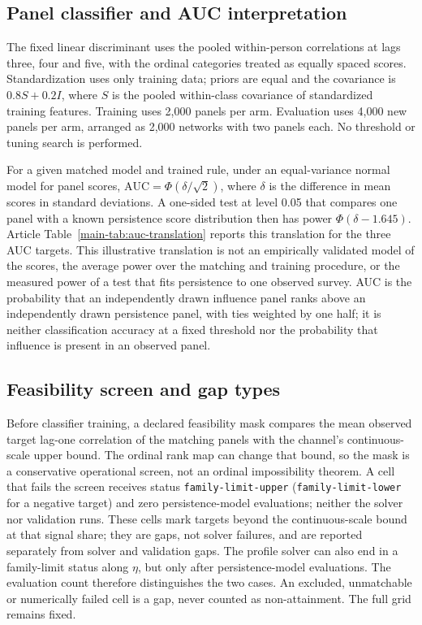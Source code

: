 \subsection{Panel classifier and AUC interpretation}\label{sec:dd-classifier}

The fixed linear discriminant uses the pooled within-person correlations at lags three, four and five, with the ordinal categories treated as equally spaced scores. Standardization uses only training data; priors are equal and the covariance is $0.8S+0.2I$, where $S$ is the pooled within-class covariance of standardized training features. Training uses 2,000 panels per arm. Evaluation uses 4,000 new panels per arm, arranged as 2,000 networks with two panels each. No threshold or tuning search is performed.

For a given matched model and trained rule, under an equal-variance normal model for panel scores, $\mathrm{AUC}=\Phi(\delta/\sqrt2)$, where $\delta$ is the difference in mean scores in standard deviations. A one-sided test at level 0.05 that compares one panel with a known persistence score distribution then has power $\Phi(\delta-1.645)$. Article Table~\ref{main-tab:auc-translation} reports this translation for the three AUC targets. This illustrative translation is not an empirically validated model of the scores, the average power over the matching and training procedure, or the measured power of a test that fits persistence to one observed survey. AUC is the probability that an independently drawn influence panel ranks above an independently drawn persistence panel, with ties weighted by one half; it is neither classification accuracy at a fixed threshold nor the probability that influence is present in an observed panel.

\subsection{Feasibility screen and gap types}\label{sec:dd-feasibility}

Before classifier training, a declared feasibility mask compares the mean observed target lag-one correlation of the matching panels with the channel's continuous-scale upper bound. The ordinal rank map can change that bound, so the mask is a conservative operational screen, not an ordinal impossibility theorem. A cell that fails the screen receives status \texttt{family-limit-upper} (\texttt{family-limit-lower} for a negative target) and zero persistence-model evaluations; neither the solver nor validation runs. These cells mark targets beyond the continuous-scale bound at that signal share; they are gaps, not solver failures, and are reported separately from solver and validation gaps. The profile solver can also end in a family-limit status along $\eta$, but only after persistence-model evaluations. The evaluation count therefore distinguishes the two cases. An excluded, unmatchable or numerically failed cell is a gap, never counted as non-attainment. The full grid remains fixed.

